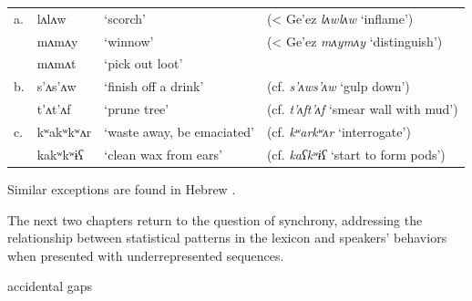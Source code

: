 \begin{example}
\begin{tabular}{l l l l}
a. & lʌlʌw     & `scorch'                   & (\textless{} Ge'ez \emph{lʌwlʌw} `inflame')     \\
   & mʌmʌy     & `winnow'                   & (\textless{} Ge'ez \emph{mʌymʌy} `distinguish') \\
   & mʌmʌt     & `pick out loot'            \\
b. & s’ʌs’ʌw   & `finish off a drink'       & (cf. \emph{s’ʌws’ʌw} `gulp down')           \\
   & t’ʌt’ʌf   & `prune tree'               & (cf. \emph{t’ʌft’ʌf} `smear wall with mud') \\
c. & kʷakʷkʷʌr & `waste away, be emaciated' & (cf. \emph{kʷarkʷʌr} `interrogate')         \\
   & kakʷkʷɨʕ  & `clean wax from ears'      & (cf. \emph{kaʕkʷɨʕ} `start to form pods')   \\
\end{tabular}
\end{example}

Similar exceptions are found in 
Hebrew \citep[][29]{Bat-El2005}.

The next two chapters return to the question of synchrony, addressing the relationship between statistical patterns in the lexicon and speakers' behaviors when presented with underrepresented sequences.

accidental gaps
\citet[][419f.]{Hayes2008a}
